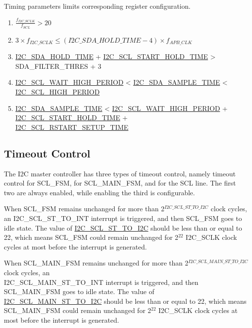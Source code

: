 \documentclass[main\_\_EN.tex]{subfiles}
\begin{document}
Timing parameters limits corresponding register configuration.
\begin{enumerate}
\item $\frac{f_{I2C\_SCLK}}{f_{SCL}} > 20$
\item $3 \times f_{I2C\_SCLK} \leq (\hyperref[fielddesc:I2CSDAHOLDTIME]{I2C\_SDA\_HOLD\_TIME}-4) \times f_{APB\_CLK}$
\item \hyperref[fielddesc:I2CSDAHOLDTIME]{I2C\_SDA\_HOLD\_TIME} + \hyperref[fielddesc:I2CSCLSTARTHOLDTIME]{I2C\_SCL\_START\_HOLD\_TIME} > SDA\_FILTER\_THRES + 3
\item \hyperref[fielddesc:I2CSCLWAITHIGHPERIOD]{I2C\_SCL\_WAIT\_HIGH\_PERIOD} < \hyperref[fielddesc:I2CSDASAMPLETIME]{I2C\_SDA\_SAMPLE\_TIME} < \hyperref[fielddesc:I2CSCLHIGHPERIOD]{I2C\_SCL\_HIGH\_PERIOD}
\item \hyperref[fielddesc:I2CSDASAMPLETIME]{I2C\_SDA\_SAMPLE\_TIME} < \hyperref[fielddesc:I2CSCLWAITHIGHPERIOD]{I2C\_SCL\_WAIT\_HIGH\_PERIOD} + \hyperref[fielddesc:I2CSCLSTARTHOLDTIME]{I2C\_SCL\_START\_HOLD\_TIME} + \\\hyperref[fielddesc:I2CSCLRSTARTSETUPTIME]{I2C\_SCL\_RSTART\_SETUP\_TIME}

\end{enumerate}

\subsection{Timeout Control}
The I2C master controller has three types of timeout control, namely timeout control for SCL\_FSM, for SCL\_MAIN\_FSM, and for the SCL line. The first two are always enabled, while enabling the third is configurable.

When SCL\_FSM remains unchanged for more than 2$^{\hyperref[fielddesc:I2CSCLSTTOI2C]{I2C\_SCL\_ST\_TO\_I2C}}$  clock cycles, an I2C\_SCL\_ST\_TO\_INT interrupt is triggered, and then SCL\_FSM goes to idle state. The value of \hyperref[fielddesc:I2CSCLSTTOI2C]{I2C\_SCL\_ST\_TO\_I2C} should be less than or equal to 22, which means SCL\_FSM could remain unchanged for 2$^{22}$ I2C\_SCLK clock cycles at most before the interrupt is generated.

When SCL\_MAIN\_FSM remains unchanged for more than 2$^{\hyperref[fielddesc:I2CSCLMAINSTTOI2C]{I2C\_SCL\_MAIN\_ST\_TO\_I2C}}$ clock cycles, an \\I2C\_SCL\_MAIN\_ST\_TO\_INT interrupt is triggered, and then SCL\_MAIN\_FSM goes to idle state. The value of \hyperref[fielddesc:I2CSCLMAINSTTOI2C]{I2C\_SCL\_MAIN\_ST\_TO\_I2C} should be less than or equal to 22, which means SCL\_MAIN\_FSM could remain unchanged for 2$^{22}$ I2C\_SCLK clock cycles at most before the interrupt is generated.
\end{document}
